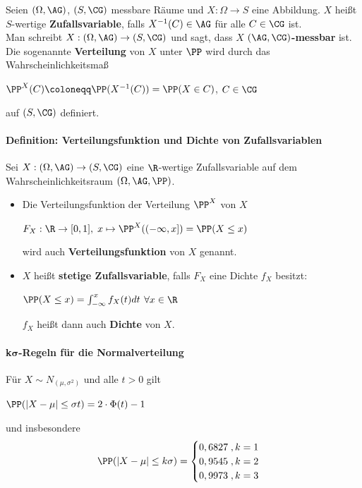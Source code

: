 Seien $(\Omega,\AG)$, $(S,\CG)$ messbare Räume und $X:\Omega\rightarrow S$ eine Abbildung.
$X$ heißt $S$-wertige \textbf{Zufallsvariable}, falls $X^{-1}(C)\in\AG$ für alle $C\in\CG$ ist.\\
Man schreibt $X:(\Omega,\AG)\rightarrow(S,\CG)$ und sagt, dass $X$ $(\AG,\CG)$\textbf{-messbar} ist.
Die sogenannte \textbf{Verteilung} von $X$ unter $\PP$ wird durch das Wahrscheinlichkeitsmaß
\begin{tightcenter}
	$\PP^X(C)\coloneqq\PP(X^{-1}(C))=\PP(X\in C)$, \qquad$C\in\CG$
\end{tightcenter}
auf $(S,\CG)$ definiert.

\paragraph{Definition: Verteilungsfunktion und Dichte von Zufallsvariablen}
Sei $X:(\Omega,\AG)\rightarrow(S,\CG)$ eine $\R$-wertige Zufallsvariable auf dem Wahrscheinlichkeitsraum $(\Omega,\AG,\PP)$.
\begin{itemize}
	\item Die Verteilungsfunktion der Verteilung $\PP^X$ von $X$
	\begin{tightcenter}
		$F_X:\R\rightarrow[0,1],\; x\mapsto\PP^X((-\infty,x])=\PP(X\leq x)$
	\end{tightcenter}
	wird auch \textbf{Verteilungsfunktion} von $X$ genannt.
	\item $X$ heißt \textbf{stetige Zufallsvariable}, falls $F_X$ eine Dichte $f_X$ besitzt:
	\begin{tightcenter}
		$\PP(X\leq x)=\int_{-\infty}^{x}f_X(t)dt$ \qquad$\forall x\in\R$
	\end{tightcenter}
	$f_X$ heißt dann auch \textbf{Dichte} von $X$.
\end{itemize}

\paragraph{k$\pmb{\sigma}$-Regeln für die Normalverteilung}
Für $X\sim N_{(\mu,\sigma^2)}$ und alle $t>0$ gilt
\begin{tightcenter}
	$\PP(|X-\mu|\leq\sigma t)=2\cdot\Phi(t)-1$
\end{tightcenter}
und insbesondere
\[   
\PP(|X-\mu|\leq k\sigma)=
\begin{cases}
	0,6827\;, k=1\\
	0,9545\;, k=2\\
	0,9973\;, k=3
\end{cases}
\]

